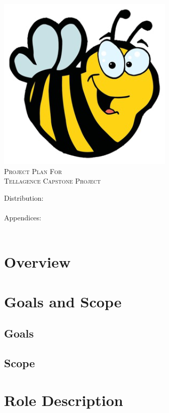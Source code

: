 \documentclass[12pt, letterpaper]{article}
\begin{document}
\begin{titlepage}

\begin{center}
\includegraphics[width=.5\textwidth]{./bee}\\[2cm]
\textsc{\LARGE Project Plan For}\\[1.5cm]
\textsc{\LARGE Tellagence Capstone Project}\\[1.5cm]
\end{center}

\begin{flushleft}
\large Distribution:\\
\hfill \\
\large Appendices:\\
\hfill \\
\end{flushleft}

\vfill

\end{titlepage}

\tableofcontents
\pagebreak 

\section{Overview}

\section{Goals and Scope}
  \subsection*{Goals}
  \subsection*{Scope}
  
\section{Role Description}
\end{document}

